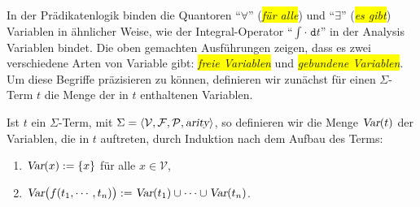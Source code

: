 In der Pr\"{a}dikatenlogik binden die Quantoren ``$\forall$'' (\colorbox{yellow}{\emph{f\"{u}r alle}}) und ``$\exists$''
(\colorbox{yellow}{\emph{es gibt}}) Variablen in \"{a}hnlicher Weise,  wie der Integral-Operator ``$\int \cdot\; \mathtt{d}t$'' in
der Analysis Variablen bindet.  Die oben gemachten Ausf\"{u}hrungen zeigen, dass es zwei verschiedene Arten von 
Variable gibt: \colorbox{yellow}{\emph{freie Variablen}} und \colorbox{yellow}{\emph{gebundene Variablen}}.
Um diese Begriffe pr\"{a}zisieren zu k\"{o}nnen, definieren wir zun\"{a}chst f\"{u}r einen
$\Sigma$-Term $t$ die Menge der in $t$ enthaltenen Variablen.

\begin{Definition}[$\var(t)$]
    Ist $t$ ein $\Sigma$-Term, mit $\Sigma = \langle \mathcal{V}, \mathcal{F}, \mathcal{P}, \textsl{arity} \rangle$,
    so definieren wir die Menge $\var(t)$ der Variablen, die in $t$
    auftreten, durch Induktion nach dem Aufbau des Terms:
    \begin{enumerate}
    \item $\textsl{Var}(x) := \{ x \}$ \quad f\"{u}r alle $x \in \mathcal{V}$,
    \item $\textsl{Var}\bigl(f(t_1,\cdots,t_n)\bigr) := \textsl{Var}(t_1) \cup \cdots \cup \textsl{Var}(t_n)$.
          \eox
    \end{enumerate}
\end{Definition}


